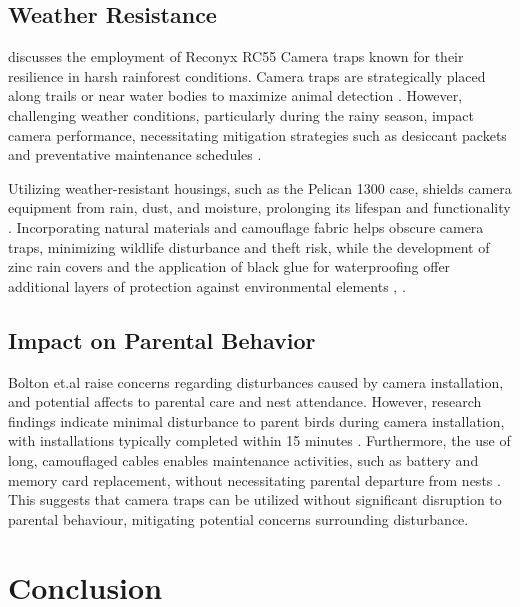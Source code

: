  
\subsection{Weather Resistance}

\cite{kays2009camera} discusses the employment of Reconyx RC55 Camera traps known for their resilience in harsh rainforest conditions. Camera traps are strategically placed along trails or near water bodies to maximize animal detection \cite{kays2009camera}. However, challenging weather conditions, particularly during the rainy season, impact camera performance, necessitating mitigation strategies such as desiccant packets and preventative maintenance schedules \cite{kays2009camera}.

Utilizing weather-resistant housings, such as the Pelican 1300 case, shields camera equipment from rain, dust, and moisture, prolonging its lifespan and functionality \cite{kays2009camera}. Incorporating natural materials and camouflage fabric helps obscure camera traps, minimizing wildlife disturbance and theft risk, while the development of zinc rain covers and the application of black glue for waterproofing offer additional layers of protection against environmental elements \cite{kays2009camera}, \cite{glover2019camera}. 


\subsection{Impact on Parental Behavior}

Bolton et.al \cite{bolton2007remote} raise concerns regarding disturbances caused by camera installation, and potential affects to parental care and nest attendance. However, research findings indicate minimal disturbance to parent birds during camera installation, with installations typically completed within 15 minutes \cite{bolton2007remote}. Furthermore, the use of long, camouflaged cables enables maintenance activities, such as battery and memory card replacement, without necessitating parental departure from nests \cite{bolton2007remote}. This suggests that camera traps can be utilized without significant disruption to parental behaviour, mitigating potential concerns surrounding disturbance.

\section{Conclusion}

